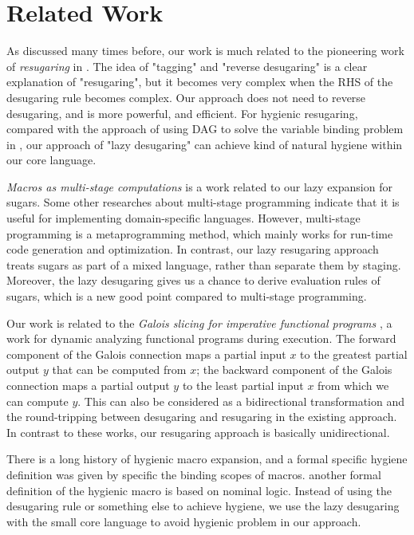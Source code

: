 \section{Related Work}
\label{sec6}
\todo{}

As discussed many times before, our work is much related to the pioneering work of \emph{resugaring} in \cite{resugaring}. The idea of "tagging" and "reverse desugaring" is a clear explanation of "resugaring", but it becomes very complex when the RHS of the desugaring rule becomes complex. Our approach does not need to reverse desugaring, and is more powerful, and efficient.
For hygienic resugaring, compared with the approach of using DAG to solve the variable binding  problem in \cite{hygienic}, our approach of "lazy desugaring" can achieve kind of natural hygiene within our core language.



\emph{Macros as multi-stage computations} \cite{multistage} is a work related to our lazy expansion for sugars. Some other researches \cite{modularstaging} about multi-stage programming \cite{MSP} indicate that it is useful for implementing domain-specific languages. However, multi-stage programming is a metaprogramming method, which mainly works for run-time code generation and optimization. In contrast, our lazy resugaring approach treats sugars as part of a mixed language, rather than separate them by staging. Moreover, the lazy desugaring gives us a chance to derive evaluation rules of sugars, which is a new good point compared to multi-stage programming.

Our work is related to the \emph{Galois slicing for imperative functional programs} \cite{slicing}, a work for dynamic analyzing functional programs during execution. The forward component of the Galois connection maps a partial input $x$ to the greatest partial output $y$ that can be computed from $x$; the backward component of the Galois connection maps a partial output $y$ to the least partial input $x$ from which we can compute $y$.
This can also be considered as a bidirectional transformation \cite{bx,lens07} and the round-tripping between desugaring and resugaring in the existing approach. In contrast to these works, our resugaring approach is basically unidirectional. 


There is a long history of hygienic macro expansion\cite{hygienicmacro}, and a formal specific hygiene definition was given \cite{10.5555/1792878.1792884} by specific the binding scopes of macros. another formal definition of the hygienic macro\cite{EssenceofHygiene} is based on nominal logic\cite{10.1007/s001650200016}. Instead of using the desugaring rule or something else to achieve hygiene, we use the lazy desugaring with the small core language to avoid hygienic problem in our approach.
%

